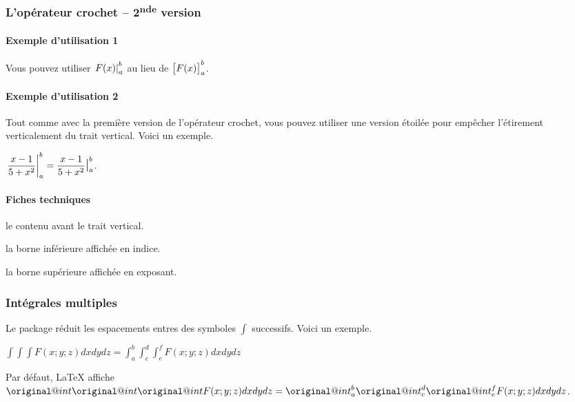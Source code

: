 \documentclass[12pt,a4paper]{article}
\newcommand\dd[1]{d#1}
\begin{document}
\subsubsection{L'opérateur crochet -- 2\textsuperscript{nde} version}

\paragraph{Exemple d'utilisation 1}

\begin{tcblisting}{}
Vous pouvez utiliser $\vhook{F(x)}{a}{b}$ au lieu de $\hook{F(x)}{a}{b}$.
\end{tcblisting}


\paragraph{Exemple d'utilisation 2}

Tout comme avec la première version de l'opérateur crochet, vous pouvez utiliser une version étoilée pour empêcher l'étirement verticalement du trait vertical. Voici un exemple.

\begin{tcblisting}{}
$\displaystyle \vhook{\frac{x - 1}{5 + x^2}}{a}{b}
             = \vhook*{\frac{x - 1}{5 + x^2}}{a}{b}$.
\end{tcblisting}


\paragraph{Fiches techniques}



 le contenu avant le trait vertical.

 la borne inférieure affichée en indice.

 la borne supérieure affichée en exposant.



\subsubsection{Intégrales multiples}

Le package réduit les espacements entres des symboles $\int$ successifs. Voici un exemple.

\begin{tcblisting}{}
$\displaystyle
  \int \int \int F(x;y;z) \dd{x} \dd{y} \dd{z}
= \int_{a}^{b} \int_{c}^{d} \int_{e}^{f} F(x;y;z) \dd{x} \dd{y} \dd{z}$
\end{tcblisting}


\begin{remark}
	Par défaut, \LaTeX{} affiche
	\makeatletter
    	$\displaystyle \original@int \original@int \original@int F(x;y;z) \dd{x} \dd{y} \dd{z}
    	= \original@int_{a}^{b} \original@int_{c}^{d} \original@int_{e}^{f} F(x;y;z) \dd{x} \dd{y} \dd{z}$.
	\makeatother
\end{remark}
\end{document}
